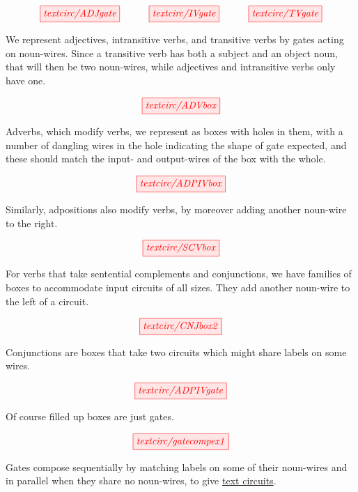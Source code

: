 \begin{marginfigure}
\centering
\[
\tikzfig{textcirc/ADJgate} \quad\quad\quad \tikzfig{textcirc/IVgate} \quad\quad\quad \tikzfig{textcirc/TVgate}
\]
\caption{We represent adjectives, intransitive verbs, and transitive verbs by gates acting on noun-wires. Since a transitive verb has both a subject and an object noun, that will then be two noun-wires, while adjectives and intransitive verbs only have one.}
\end{marginfigure}

\begin{marginfigure}
\centering
\[
\tikzfig{textcirc/ADVbox}
\]
\caption{Adverbs, which modify verbs, we represent as boxes with holes in them, with a number of dangling wires in the hole indicating the shape of gate expected, and these should match the input- and output-wires  of the box with the whole.}
\end{marginfigure}

\begin{marginfigure}
\centering
\[
\tikzfig{textcirc/ADPIVbox}
\]  
\caption{Similarly, adpositions also modify verbs, by moreover adding another noun-wire to the right.}
\end{marginfigure}

\begin{marginfigure}
\centering
\[
\tikzfig{textcirc/SCVbox}
\]
\caption{For verbs that take sentential complements and conjunctions, we have families of boxes to accommodate input circuits of all sizes. They add another noun-wire to the left of a circuit.}
\end{marginfigure}

\begin{marginfigure}
\centering
\[
\tikzfig{textcirc/CNJbox2}
\]
\caption{Conjunctions are boxes that take two circuits which might share labels on some wires.}
\end{marginfigure}

\begin{marginfigure}
\centering
\[
\tikzfig{textcirc/ADPIVgate}
\]
\caption{Of course filled up boxes are just gates.}
\end{marginfigure}

\begin{marginfigure}
\centering
\[
\tikzfig{textcirc/gatecompex1}  
\]
\caption{Gates compose sequentially by matching labels on some of their noun-wires and in parallel when they share no noun-wires, to give \underline{text circuits}.}
\end{marginfigure}

